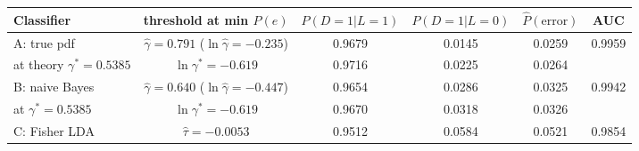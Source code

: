 \begin{tabular}{lccccc}
\toprule
Classifier & threshold at min $P(e)$ & $P(D{=}1|L{=}1)$ & $P(D{=}1|L{=}0)$ & $\hat P(\text{error})$ & AUC \\
\midrule
A: true pdf & $\hat\gamma = 0.791$ ($\ln\hat\gamma=-0.235$) & 0.9679 & 0.0145 & 0.0259 & 0.9959 \\
\quad at theory $\gamma^*=0.5385$ & $\ln\gamma^*=-0.619$ & 0.9716 & 0.0225 & 0.0264 & \\
B: naive Bayes & $\hat\gamma = 0.640$ ($\ln\hat\gamma=-0.447$) & 0.9654 & 0.0286 & 0.0325 & 0.9942 \\
\quad at $\gamma^*=0.5385$ & $\ln\gamma^*=-0.619$ & 0.9670 & 0.0318 & 0.0326 & \\
C: Fisher LDA & $\hat\tau = -0.0053$ & 0.9512 & 0.0584 & 0.0521 & 0.9854 \\
\bottomrule
\end{tabular}
